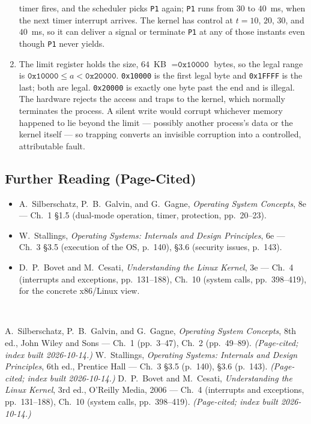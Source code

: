 \documentclass[11pt]{article}
\begin{document}
\begin{enumerate}
    timer fires, and the scheduler picks \texttt{P1} again; \texttt{P1} runs
    from $30$ to $40$~ms, when the next timer interrupt arrives. The kernel
    has control at $t=10$, $20$, $30$, and $40$~ms, so it can deliver a signal
    or terminate \texttt{P1} at any of those instants even though \texttt{P1}
    never yields.
  \item The limit register holds the size, $64$~KB $= \texttt{0x10000}$ bytes,
    so the legal range is $\texttt{0x10000} \le a < \texttt{0x20000}$.
    \texttt{0x10000} is the first legal byte and \texttt{0x1FFFF} is the last;
    both are legal. \texttt{0x20000} is exactly one byte past the end and is
    illegal. The hardware rejects the access and traps to the kernel, which
    normally terminates the process. A silent write would corrupt whichever
    memory happened to lie beyond the limit --- possibly another process's data
    or the kernel itself --- so trapping converts an invisible corruption into
    a controlled, attributable fault.
\end{enumerate}
\endgroup

\subsection*{Further Reading (Page-Cited)}

\begin{itemize}
  \item A.~Silberschatz, P.~B.~Galvin, and G.~Gagne, \emph{Operating System
    Concepts}, 8e --- Ch.~1 \S1.5 (dual-mode operation, timer, protection,
    pp.~20--23).
  \item W.~Stallings, \emph{Operating Systems: Internals and Design
    Principles}, 6e --- Ch.~3 \S3.5 (execution of the OS, p.~140), \S3.6
    (security issues, p.~143).
  \item D.~P.~Bovet and M.~Cesati, \emph{Understanding the Linux Kernel}, 3e
    --- Ch.~4 (interrupts and exceptions, pp.~131--188), Ch.~10 (system calls,
    pp.~398--419), for the concrete x86/Linux view.
\end{itemize}

\noindent{}\\

\begin{thebibliography}{9}
A.~Silberschatz, P.~B.~Galvin, and G.~Gagne, \emph{Operating System Concepts},
8th ed., John Wiley and Sons --- Ch.~1 (pp.~3--47), Ch.~2 (pp.~49--89).
\emph{(Page-cited; index built 2026-10-14.)}
W.~Stallings, \emph{Operating Systems: Internals and Design Principles}, 6th
ed., Prentice Hall --- Ch.~3 \S3.5 (p.~140), \S3.6 (p.~143).
\emph{(Page-cited; index built 2026-10-14.)}
D.~P.~Bovet and M.~Cesati, \emph{Understanding the Linux Kernel}, 3rd ed.,
O'Reilly Media, 2006 --- Ch.~4 (interrupts and exceptions, pp.~131--188),
Ch.~10 (system calls, pp.~398--419). \emph{(Page-cited; index built
2026-10-14.)}
\end{thebibliography}
\end{document}

